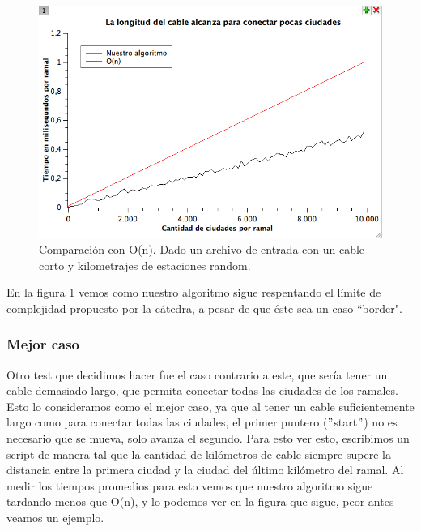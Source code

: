 \begin{figure}[H]
\begin{center}

  \includegraphics[width=\linewidth]{../graficos/ej1/CableCorto.png}
  \caption{{\small Comparación con O(n). Dado un archivo de entrada con un cable corto y kilometrajes de estaciones random.}} \label{ej1-tiempo-vs-cant-ciudades-random-long-cable-1}
\endminipage

\end{center}
\end{figure}

En la figura \ref{ej1-tiempo-vs-cant-ciudades-random-long-cable-1} vemos como nuestro algoritmo sigue respentando el límite de complejidad propuesto por la cátedra, a pesar de que éste sea un caso ``border". \\

\subsubsection{Mejor caso}

Otro test que decidimos hacer fue el caso contrario a este, que sería tener un cable demasiado largo, que permita conectar todas las ciudades de los ramales. Esto lo consideramos como el mejor caso, ya que al tener un cable suficientemente largo como para conectar todas las ciudades, el primer puntero ($"$start$"$) no es necesario que se mueva, solo avanza el segundo. Para esto ver esto, escribimos un script de manera tal que la cantidad de kilómetros de cable siempre supere la distancia entre la primera ciudad y la ciudad del último kilómetro del ramal. Al medir los tiempos promedios para esto vemos que nuestro algoritmo sigue tardando menos que O(n), y lo podemos ver en la figura que sigue, peor antes veamos un ejemplo. \\


